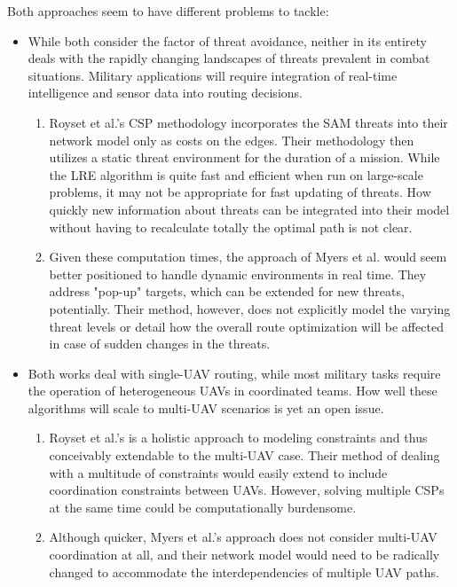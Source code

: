 \documentclass[conference]{IEEEtran}
\begin{document}
Both approaches seem to have different problems to tackle:
\begin{itemize}
    \item While both consider the factor of threat avoidance, neither in its entirety deals with the rapidly changing landscapes of threats prevalent in combat situations. Military applications will require integration of real-time intelligence and sensor data into routing decisions.
        \begin{enumerate}
            \item Royset et al.'s CSP methodology incorporates the SAM threats into their network model only as costs on the edges. Their methodology then utilizes a static threat environment for the duration of a mission. While the LRE algorithm is quite fast and efficient when run on large-scale problems, it may not be appropriate for fast updating of threats. How quickly new information about threats can be integrated into their model without having to recalculate totally the optimal path is not clear.
            \item Given these computation times, the approach of Myers et al.  would seem better positioned to handle dynamic environments in real time. They address "pop-up" targets, which can be extended for new threats, potentially. Their method, however, does not explicitly model the varying threat levels or detail how the overall route optimization will be affected in case of sudden changes in the threats.
        \end{enumerate}
    \item Both works deal with single-UAV routing, while most military tasks require the operation of heterogeneous UAVs in coordinated teams. How well these algorithms will scale to multi-UAV scenarios is yet an open issue.
        \begin{enumerate}
            \item Royset et al.'s is a holistic approach to modeling constraints and thus conceivably extendable to the multi-UAV case. Their method of dealing with a multitude of constraints would easily extend to include coordination constraints between UAVs. However, solving multiple CSPs at the same time could be computationally burdensome.
            \item Although quicker, Myers et al.'s approach does not consider multi-UAV coordination at all, and their network model would need to be radically changed to accommodate the interdependencies of multiple UAV paths.
        \end{enumerate}

\end{itemize}
\end{document}
